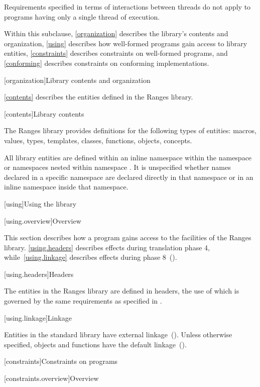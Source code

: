 \pnum
Requirements specified in terms of interactions between threads do not apply to
programs having only a single thread of execution.

\pnum
Within this subclause, \ref{organization} describes the library's contents and
organization, \ref{using} describes how well-formed \Cpp programs gain access to
library entities, \ref{constraints} describes constraints on well-formed \Cpp
programs, and \ref{conforming} describes constraints on conforming
implementations.

[organization]{Library contents and organization}

\pnum
\ref{contents} describes the entities defined in the Ranges library.

[contents]{Library contents}

\pnum
The Ranges library provides definitions for the following types of entities:
macros, values, types, templates, classes, functions, objects, concepts.

\pnum
All library entities are defined within an inline namespace  within
the namespace  or namespaces nested within
namespace .
It is unspecified whether names declared in a specific namespace are declared
directly in that namespace or in an inline namespace inside that namespace.

[using]{Using the library}

[using.overview]{Overview}

\pnum
This section describes how a \Cpp program gains access to the facilities of the
Ranges library. \ref{using.headers} describes effects during translation
phase 4, while~\ref{using.linkage} describes effects during phase
8~().

[using.headers]{Headers}

The entities in the Ranges library are defined in headers, the use of which is
governed by the same requirements as specified in .

[using.linkage]{Linkage}

\pnum
Entities in the \Cpp standard library have external
linkage~(). Unless otherwise specified, objects and functions
have the default  linkage~().

[constraints]{Constraints on programs}

[constraints.overview]{Overview}

